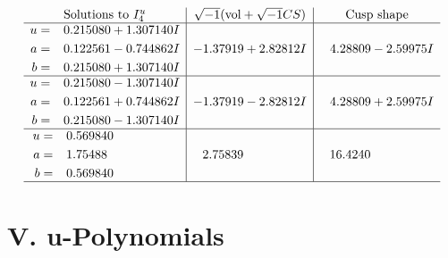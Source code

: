 \documentclass[1p]{elsarticle_modified}
\theoremstyle{definition}
\newcommand{\I}{\sqrt{-1}}
\begin{document}
$$\begin{array}{c|c|c}  
\text{Solutions to }I^u_{4}& \I (\text{vol} + \sqrt{-1}CS) & \text{Cusp shape}\\
 \hline 
\begin{aligned}
u &= \phantom{-}0.215080 + 1.307140 I \\
a &= \phantom{-}0.122561 - 0.744862 I \\
b &= \phantom{-}0.215080 + 1.307140 I\end{aligned}
 & -1.37919 + 2.82812 I & \phantom{-}4.28809 - 2.59975 I \\ \hline\begin{aligned}
u &= \phantom{-}0.215080 - 1.307140 I \\
a &= \phantom{-}0.122561 + 0.744862 I \\
b &= \phantom{-}0.215080 - 1.307140 I\end{aligned}
 & -1.37919 - 2.82812 I & \phantom{-}4.28809 + 2.59975 I \\ \hline\begin{aligned}
u &= \phantom{-}0.569840\phantom{ +0.000000I} \\
a &= \phantom{-}1.75488\phantom{ +0.000000I} \\
b &= \phantom{-}0.569840\phantom{ +0.000000I}\end{aligned}
 & \phantom{-}2.75839\phantom{ +0.000000I} & \phantom{-}16.4240\phantom{ +0.000000I}\\
 \hline 
 \end{array}$$\newpage
\newpage\renewcommand{\arraystretch}{1}
\centering \section*{ V. u-Polynomials}
\end{document}
